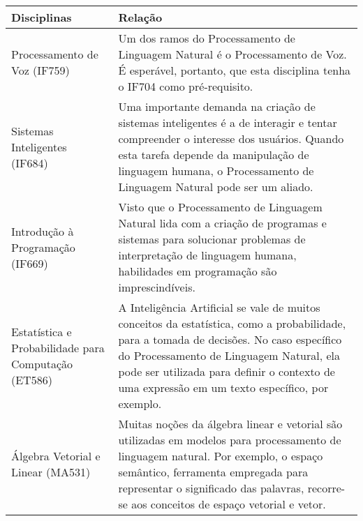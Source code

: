 \documentclass[a4paper]{article}
\begin{document}
\begin{table}[h]
\begin{tabular}{|p{5cm}|p{}|}
\hline
\textbf{Disciplinas}                                & \textbf{Relação}                                                                                                                                                                                                                                                                      \\ \hline
Processamento de Voz (IF759)                        & Um dos ramos do Processamento de Linguagem Natural é o Processamento de Voz. É esperável, portanto, que esta disciplina tenha o IF704 como pré-requisito.                                                                                                                             \\ \hline
Sistemas Inteligentes (IF684)                       & Uma importante demanda na criação de sistemas inteligentes é a de interagir e tentar compreender o interesse dos usuários. Quando esta tarefa depende da manipulação de linguagem humana, o Processamento de Linguagem Natural pode ser um aliado.                        \\ \hline
Introdução à Programação (IF669)                    & Visto que o Processamento de Linguagem Natural lida com a criação de programas e sistemas para solucionar problemas de interpretação de linguagem humana, habilidades em programação são imprescindíveis.                                                                             \\ \hline
Estatística e Probabilidade para Computação (ET586) & A Inteligência Artificial se vale de muitos conceitos da estatística, como a probabilidade, para a tomada de decisões. No caso específico do Processamento de Linguagem Natural, ela pode ser utilizada para definir o contexto de uma expressão em um texto específico, por exemplo. \\ \hline
Álgebra Vetorial e Linear (MA531)                   & Muitas noções da álgebra linear e vetorial são utilizadas em modelos para processamento de linguagem natural. Por exemplo, o espaço semântico, ferramenta empregada para representar o significado das palavras, recorre-se aos conceitos de espaço vetorial e vetor.              \\ \hline
\end{tabular}
\end{table}

\nocite{slp}
\nocite{iir}
\nocite{nlpp}



\end{document}
